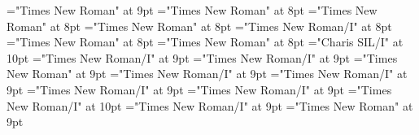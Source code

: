 \documentclass[gps1,twoside]{article}
\begin{document}
\font\spandefinitionorglosssensesensessensesensessubentrysubentriesentrylastchildafterspansensespanspansubentrysubentriesdiventryletData="Times New Roman" at 9pt
\font\examplespansensespanspansubentrysubentriesdiventryletData="Times New Roman" at 8pt
\font\examplebeforespansensespanspansubentrysubentriesdiventryletData="Times New Roman" at 8pt
\font\exampleafterspansensespanspansubentrysubentriesdiventryletData="Times New Roman" at 8pt
\font\exampleexamplespansensespanspansubentrysubentriesdiventryletData="Times New Roman/I" at 8pt
\font\examplebeforeexamplespansensespanspansubentrysubentriesdiventryletData="Times New Roman" at 8pt
\font\exampleafterexamplespansensespanspansubentrysubentriesdiventryletData="Times New Roman" at 8pt
\font\spanbzhexampleexamplespansensespanspansubentrysubentriesdiventryletData="Charis SIL/I" at 10pt
\font\spanexampleexampleexamplessensesensessensesensessubentrysubentriesentrylastchildafterexampleexamplespansensespanspansubentrysubentriesdiventryletData="Times New Roman/I" at 9pt
\font\spanexampleexampleexamplessensesensessensesensessubentrysubentriesentryexamplespansensespanspansubentrysubentriesdiventryletData="Times New Roman/I" at 9pt
\font\spanexampleexampleexamplessensesensessensesensessubentrysubentriesentrylastchildafterexamplespansensespanspansubentrysubentriesdiventryletData="Times New Roman" at 9pt
\font\translationspanexampleexampleexamplessensesensessensesensessubentrysubentriesentryexamplespansensespanspansubentrysubentriesdiventryletData="Times New Roman/I" at 9pt
\font\translationafterspanexampleexampleexamplessensesensessensesensessubentrysubentriesentryexamplespansensespanspansubentrysubentriesdiventryletData="Times New Roman/I" at 9pt
\font\translationtranslationspanexampleexampleexamplessensesensessensesensessubentrysubentriesentryexamplespansensespanspansubentrysubentriesdiventryletData="Times New Roman/I" at 9pt
\font\translationaftertranslationspanexampleexampleexamplessensesensessensesensessubentrysubentriesentryexamplespansensespanspansubentrysubentriesdiventryletData="Times New Roman/I" at 9pt
\font\spanentranslationtranslationspanexampleexampleexamplessensesensessensesensessubentrysubentriesentryexamplespansensespanspansubentrysubentriesdiventryletData="Times New Roman/I" at 10pt
\font\spantranslationtranslationtranslationsexampleexamplessensesensessensesensessubentrysubentriesentrylastchildaftertranslationtranslationspanexampleexampleexamplessensesensessensesensessubentrysubentriesentryexamplespansensespanspansubentrysubentriesdiventryletData="Times New Roman/I" at 9pt
\font\spanspansensespanspansubentrysubentriesdiventryletData="Times New Roman" at 9pt
\end{document}
